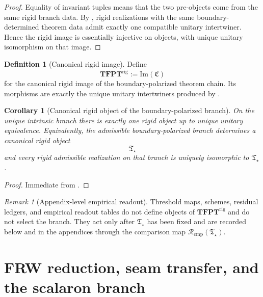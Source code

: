 \documentclass[11pt,a4paper]{article}
\newtheorem{corollary}[theorem]{Corollary}
\theoremstyle{definition}
\newtheorem{definition}[theorem]{Definition}
\theoremstyle{remark}
\newtheorem*{remark}{Remark}
\newcommand{\Tstar}{\mathfrak T_{\star}}
\newcommand{\Rcmp}{\mathcal R_{\mathrm{cmp}}}
\begin{document}
\begin{proof}
Equality of invariant tuples means that the two pre-objects come from the same rigid branch data.
By , rigid realizations with the same
boundary-determined theorem data admit exactly one compatible unitary intertwiner. Hence the rigid
image is essentially injective on objects, with unique unitary isomorphism on that image.
\end{proof}

\begin{definition}[Canonical rigid image]
\label{def:tfpt-rigid-category}
Define
\[
\mathbf{TFPT}^{\mathrm{rig}}
:=
\mathrm{Im}(\mathfrak C)
\]
for the canonical rigid image of the boundary-polarized theorem chain. Its morphisms are exactly
the unique unitary intertwiners produced by
.
\end{definition}

\begin{corollary}[Canonical rigid object of the boundary-polarized branch]
\label{thm:no-alternatives-tfpt}
\label{cor:no-alternatives-tfpt}
\label{cor:canonical-rigid-object-unique-branch}
On the unique intrinsic branch there is exactly one rigid object up to unique unitary equivalence.
Equivalently, the admissible boundary-polarized branch determines a canonical rigid object
\[
\Tstar
\]
and every rigid admissible realization on that branch is uniquely isomorphic to $\Tstar$.
\end{corollary}

\begin{proof}
Immediate from
.
\end{proof}

\begin{remark}[Appendix-level empirical readout]
Threshold maps, schemes, residual ledgers, and empirical readout tables do not define objects of
$\mathbf{TFPT}^{\mathrm{rig}}$ and do not select the branch. They act only after
$\Tstar$ has been fixed and are recorded below and in the appendices through the comparison map
$\Rcmp(\Tstar)$.
\end{remark}

\section{FRW reduction, seam transfer, and the scalaron branch}
\label{sec:cosmology-closure}
\end{document}

